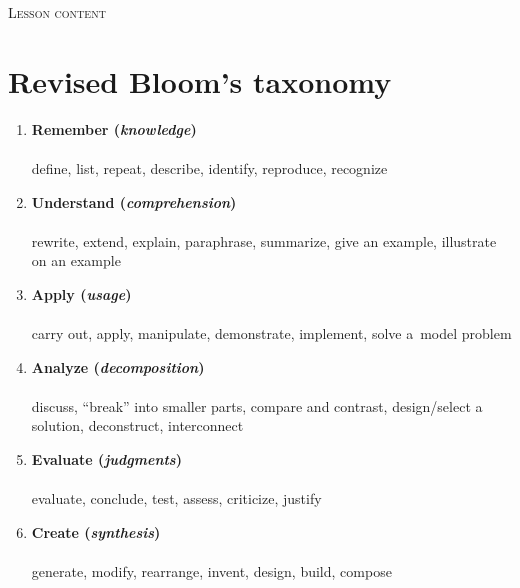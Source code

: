 \textsc{Lesson content}\\

\newpage

\chapter*{Revised Bloom's taxonomy}
\label{bloom}
\vspace{-0.5em}
\vspace{-0.3em}

\begin{enumerate}[leftmargin=*]
\item \textbf{Remember (\textit{knowledge})}\\
\\
{\small define, list, repeat, describe, identify, reproduce, recognize}

\item \textbf{Understand (\textit{comprehension})}\\
\\
{\small rewrite, extend, explain, paraphrase, summarize, give an example, illustrate on an example}

\item \textbf{Apply (\textit{usage})}\\
\\
{\small carry out, apply, manipulate, demonstrate, implement, solve a~model problem}

\item \textbf{Analyze (\textit{decomposition})}\\
\\
{\small discuss, \enquote{break} into smaller parts, compare and contrast, design/select a solution, deconstruct, interconnect}

\item \textbf{Evaluate (\textit{judgments})}\\
\\
{\small evaluate, conclude, test, assess, criticize, justify}

\item \textbf{Create (\textit{synthesis})}\\
\\
{\small generate, modify, rearrange, invent, design, build, compose}
\end{enumerate}

